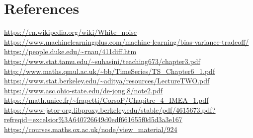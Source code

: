 \documentclass{article}
\begin{document}
\section{References}
\url{https://en.wikipedia.org/wiki/White\_noise}\\
\url{https://www.machinelearningplus.com/machine-learning/bias-variance-tradeoff/}\\
\url{https://people.duke.edu/~rnau/411diff.htm}\\
\url{https://www.stat.tamu.edu/~suhasini/teaching673/chapter3.pdf}\\
\url{http://www.maths.qmul.ac.uk/~bb/TimeSeries/TS_Chapter6_1.pdf}\\
\url{https://www.stat.berkeley.edu/~aditya/resources/LectureTWO.pdf}\\
\url{https://www.asc.ohio-state.edu/de-jong.8/note2.pdf}\\
\url{https://math.unice.fr/~frapetti/CorsoP/Chapitre_4_IMEA_1.pdf}\\
\url{https://www-jstor-org.libproxy.berkeley.edu/stable/pdf/4615673.pdf?refreqid=excelsior\%3A640726649d0edf661655f0d5d3a3e167}\\
\url{https://courses.maths.ox.ac.uk/node/view_material/924}
\end{document}
